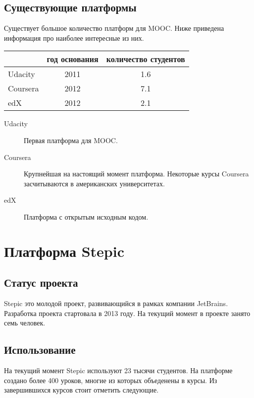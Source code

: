 \documentclass{matmex-diploma-custom}
\begin{document}
\subsection*{Существующие платформы}

Существует большое количество платформ для MOOC. Ниже приведена
информация про наиболее интересные из них.

\begin{tabular}{|l|c|c|}
\hline
 & год основания & количество студентов \\
\hline
Udacity & 2011 & 1.6 \\
Coursera & 2012 & 7.1 \\
edX & 2012 & 2.1 \\
\hline
\end{tabular}

\iffalse
#+ORGTBL: SEND plat orgtbl-to-latex :splice nil :skip 0
|----------+---------------+----------------------|
|          | год основания | количество студентов |
|----------+---------------+----------------------|
| Udacity  |          2011 |                  1.6 |
| Coursera |          2012 |                  7.1 |
| edX      |          2012 |                  2.1 |
|----------+---------------+----------------------|
\fi


\begin{description}
\item[Udacity] Первая платформа для MOOC.
\item[Coursera] Крупнейшая на настоящий момент платформа. Некоторые
  курсы Coursera засчитываются в американских университетах.
\item[edX] Платформа с открытым исходным кодом.
\end{description}

\section{Платформа Stepic}

\subsection{Статус проекта}
Stepic\cite{stepic} это молодой проект, развивающийся в рамках компании
JetBrains. Разработка проекта стартовала в 2013 году. На текущий
момент в проекте занято семь человек.

\subsection{Использование}
На текущий момент Stepic используют 23 тысячи студентов. На платформе
создано более 400 уроков, многие из которых объеденены в курсы. Из
завершившихся курсов стоит отметить следующие.
\end{document}
